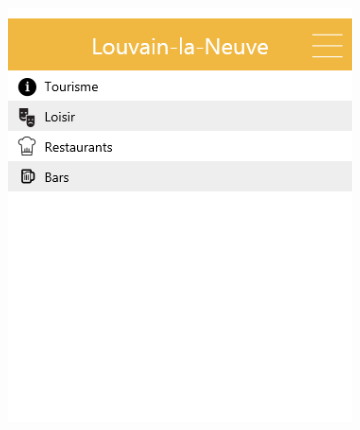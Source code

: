 \documentclass{eplmastersthesis}
\begin{document}
\begin{figure}[H]
    \centering
\begin{subfigure}[b]{0.3\textwidth}
        \includegraphics[width=\textwidth]{Images/InVision/menu-city.png}
    \end{subfigure}
    ~ %
    \begin{subfigure}[b]{0.3\textwidth}

\end{subfigure}
\end{figure}
\end{document}
